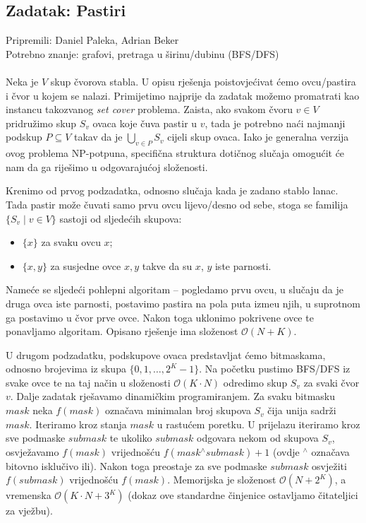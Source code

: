 \subsection*{Zadatak: Pastiri}
\textsf{Pripremili: Daniel Paleka, Adrian Beker}\\
\textsf{Potrebno znanje: grafovi, pretraga u širinu/dubinu (BFS/DFS)}
\\\\
Neka je $V$ skup čvorova stabla. U opisu rješenja poistovjećivat ćemo ovcu/pastira i čvor u kojem se nalazi. Primijetimo najprije da zadatak možemo promatrati kao instancu takozvanog \emph{set cover} problema. Zaista, ako svakom čvoru $v \in V$ pridružimo skup $S_v$ ovaca koje čuva pastir u $v$, tada je potrebno naći najmanji podskup $P \subseteq V$ takav da je $\bigcup_{v \in P} S_v$ cijeli skup ovaca. Iako je generalna verzija ovog problema NP-potpuna, specifična struktura dotičnog slučaja omogućit će nam da ga riješimo u odgovarajućoj složenosti.

Krenimo od prvog podzadatka, odnosno slučaja kada je zadano stablo lanac. Tada pastir može čuvati samo prvu ovcu lijevo/desno od sebe, stoga se familija $\{S_v \mid v \in V\}$ sastoji od sljedećih skupova:
\begin{itemize}
    \item $\{x\}$ za svaku ovcu $x$;
    \item $\{x, y\}$ za susjedne ovce $x, y$ takve da su $x$, $y$ iste parnosti.
\end{itemize}
Nameće se sljedeći pohlepni algoritam -- pogledamo prvu ovcu, u slučaju da je druga ovca iste parnosti, postavimo pastira na pola puta izme\dj u njih, u suprotnom ga postavimo u čvor prve ovce. Nakon toga uklonimo pokrivene ovce te ponavljamo algoritam. Opisano rješenje ima složenost $\mathcal{O}(N + K)$.

U drugom podzadatku, podskupove ovaca predstavljat ćemo bitmaskama, odnosno brojevima iz skupa $\{0, 1, \ldots, 2^K-1\}$. Na početku pustimo BFS/DFS iz svake ovce te na taj način u složenosti $\mathcal{O}(K \cdot N)$ odredimo skup $S_v$ za svaki čvor $v$. Dalje zadatak rješavamo dinamičkim programiranjem. Za svaku bitmasku $mask$ neka $f(mask)$ označava minimalan broj skupova $S_v$ čija unija sadrži $mask$. Iteriramo kroz stanja $mask$ u rastućem poretku. U prijelazu iteriramo kroz sve podmaske $submask$ te ukoliko $submask$ odgovara nekom od skupova $S_v$, osvježavamo $f(mask)$ vrijednošću $f(mask \mathbin{^\wedge} submask) + 1$ (ovdje $^\wedge$ označava bitovno isklučivo ili). Nakon toga preostaje za sve podmaske $submask$ osvježiti $f(submask)$ vrijednošću $f(mask)$. Memorijska je složenost $\mathcal{O}(N + 2^K)$, a vremenska $\mathcal{O}(K \cdot N + 3^K)$ (dokaz ove standardne činjenice ostavljamo čitateljici za vježbu).

